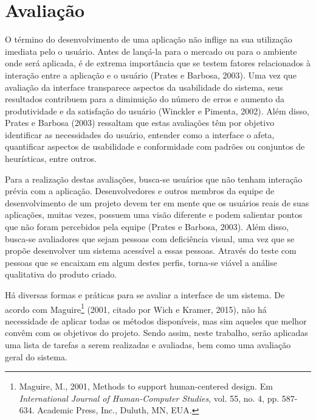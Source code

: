 \chapter{\label{chap:avaliacao}Avaliação}
\color{blue}
O término do desenvolvimento de uma aplicação não inflige na sua utilização imediata pelo o usuário. Antes de lançá-la para o mercado ou para o ambiente onde será aplicada, é de extrema importância que se testem fatores relacionados à interação entre a aplicação e o usuário (Prates e Barbosa, 2003). Uma vez que avaliação da interface transparece aspectos da usabilidade do sistema, seus resultados contribuem para a diminuição do número de erros e aumento da produtividade e da satisfação do usuário (Winckler e Pimenta, 2002)\nocite{WINCKLER2002}. Além disso, Prates e Barbosa (2003) ressaltam que estas avaliações têm por objetivo identificar as necessidades do usuário, entender como a interface o afeta, quantificar aspectos de usabilidade e conformidade com padrões ou conjuntos de heurísticas, entre outros.

Para a realização destas avaliações, busca-se usuários que não tenham interação prévia com a aplicação. Desenvolvedores e outros membros da equipe de desenvolvimento de um projeto devem ter em mente que os usuários reais de suas aplicações, muitas vezes, possuem uma visão diferente e podem salientar pontos que não foram percebidos pela equipe (Prates e Barbosa, 2003). Além disso, busca-se avaliadores que sejam pessoas com deficiência visual, uma vez que se propõe desenvolver um sistema acessível a essas pessoas. Através do teste com pessoas que se encaixam em algum destes perfis, torna-se viável a análise qualitativa do produto criado.

Há diversas formas e práticas para se avaliar a interface de um sistema. De acordo com Maguire\footnote{Maguire, M., 2001, Methods to support human-centered design. Em \emph{International Journal of Human-Computer Studies}, vol. 55, no. 4, pp. 587-634. Academic Press, Inc., Duluth, MN, EUA.} (2001, citado por Wich e Kramer, 2015\nocite{WICH2015}), não há necessidade de aplicar todas os métodos disponíveis, mas sim aqueles que melhor convêm com os objetivos do projeto. Sendo assim, neste trabalho, serão aplicadas uma lista de tarefas a serem realizadas e avaliadas, bem como uma avaliação geral do sistema.

